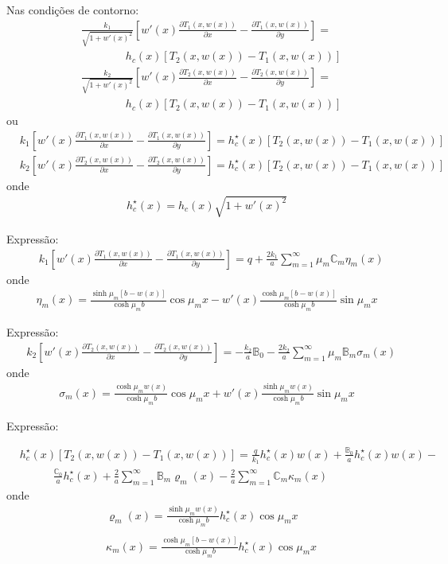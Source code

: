 Nas condições de contorno:
\begin{align}
& \frac{k_1}{\sqrt{1 + w'(x)^2}}\left[w'(x)\frac{\partial T_1(x, w(x))}{\partial x} - \frac{\partial T_1(x, w(x))}{\partial y}\right] = \nonumber \\
& \quad\quad\quad\quad h_c(x)[T_2(x, w(x)) - T_1(x, w(x))] \\
& \frac{k_2}{\sqrt{1 + w'(x)^2}}\left[w'(x)\frac{\partial T_2(x, w(x))}{\partial x} - \frac{\partial T_2(x, w(x))}{\partial y}\right] = \nonumber \\
& \quad\quad\quad\quad h_c(x)[T_2(x, w(x)) - T_1(x, w(x))]
\end{align}
ou
\begin{align}
& k_1\left[w'(x)\frac{\partial T_1(x, w(x))}{\partial x} - \frac{\partial T_1(x, w(x))}{\partial y}\right] = h^\star_c(x)[T_2(x, w(x)) - T_1(x, w(x))] \\
& k_2\left[w'(x)\frac{\partial T_2(x, w(x))}{\partial x} - \frac{\partial T_2(x, w(x))}{\partial y}\right] = h^\star_c(x)[T_2(x, w(x)) - T_1(x, w(x))]
\end{align}
onde
\begin{align}
h^\star_c(x) = h_c(x)\sqrt{1 + w'(x)^2}
\end{align}

Expressão:
\begin{align}
& k_1\left[w'(x)\frac{\partial T_1(x, w(x))}{\partial x} - \frac{\partial T_1(x, w(x))}{\partial y}\right] = q + \frac{2k_1}{a}\sum_{m=1}^\infty \mu_m\mathbb{C}_m \eta_m(x)
\end{align}
onde
\begin{align}
\eta_m(x) = \frac{\sinh\mu_m [b - w(x)]}{\cosh\mu_m b}\cos\mu_m x - w'(x) \frac{\cosh\mu_m [b - w(x)]}{\cosh\mu_m b}\sin\mu_m x
\end{align}

Expressão:
\begin{align}
& k_2\left[w'(x)\frac{\partial T_2(x, w(x))}{\partial x} - \frac{\partial T_2(x, w(x))}{\partial y}\right] = - \frac{k_2}{a}\mathbb{B}_0 - \frac{2k_2}{a}\sum_{m=1}^\infty \mu_m \mathbb{B}_m \sigma_m(x)
\end{align}
onde
\begin{align}
\sigma_m(x) = \frac{\cosh\mu_m w(x)}{\cosh\mu_m b} \cos\mu_m x + w'(x)\frac{\sinh\mu_m w(x)}{\cosh\mu_m b} \sin\mu_m x
\end{align}

Expressão:

\begin{align}
& h^\star_c(x)[T_2(x, w(x)) - T_1(x, w(x))] = \frac{q}{k_1}h^\star_c(x) w(x) + \frac{\mathbb{B}_0}{a}h^\star_c(x)w(x) - \nonumber \\
& \quad\quad\quad \frac{\mathbb{C}_0}{a}h^\star_c(x) +
\frac{2}{a}\sum_{m=1}^\infty\mathbb{B}_m \varrho_m(x)  - \frac{2}{a}\sum_{m=1}^\infty \mathbb{C}_m \kappa_m(x)
\end{align}
onde
\begin{align}
& \varrho_m(x) = \frac{\sinh\mu_m w(x)}{\cosh\mu_m b} h^\star_c(x)\cos\mu_m x \\ \nonumber \\
& \kappa_m(x) = \frac{\cosh\mu_m [b - w(x)]}{\cosh\mu_m b}h^\star_c(x)\cos\mu_m x
\end{align}

